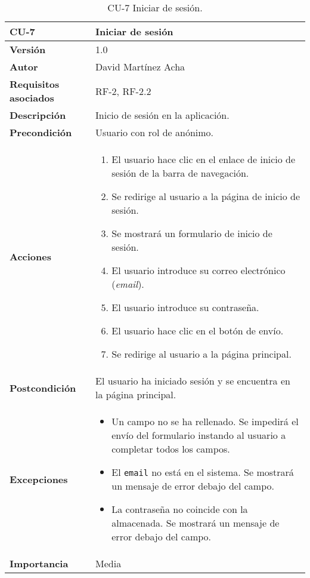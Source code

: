 \begin{table}[p]
	\centering
	\begin{tabularx}{\linewidth}{ p{} p{} }
		\toprule
		\textbf{CU-7}    & \textbf{Iniciar de sesión}\\
		\toprule
		\textbf{Versión}              & 1.0    \\
		\textbf{Autor}                & David Martínez Acha \\
		\textbf{Requisitos asociados} & RF-2, RF-2.2 \\
		\textbf{Descripción}          & Inicio de sesión en la aplicación. \\
		\textbf{Precondición}         & Usuario con rol de anónimo. \\
		\textbf{Acciones}             &
		\begin{enumerate}
			\def\labelenumi{\arabic{enumi}.}
			\tightlist
			\item El usuario hace clic en el enlace de inicio de sesión de la barra de navegación.
			\item Se redirige al usuario a la página de inicio de sesión.
			\item Se mostrará un formulario de inicio de sesión.
			\item El usuario introduce su correo electrónico (\textit{email}).
			\item El usuario introduce su contraseña.
            \item El usuario hace clic en el botón de envío.
			\item Se redirige al usuario a la página principal.
		\end{enumerate}\\
		\textbf{Postcondición}        & El usuario ha iniciado sesión y se encuentra en la página principal. \\
		\textbf{Excepciones}          & \begin{itemize}
			\item Un campo no se ha rellenado. Se impedirá el envío del formulario instando al usuario a completar todos los campos.
			\item El \texttt{email} no está en el sistema. Se mostrará un mensaje de error debajo del campo.
			\item La contraseña no coincide con la almacenada. Se mostrará un mensaje de error debajo del campo.
		\end{itemize}\\
		\textbf{Importancia}          & Media \\
		\bottomrule
	\end{tabularx}
	\caption{CU-7 Iniciar de sesión.}
\end{table}

